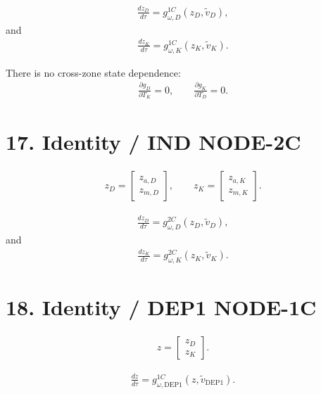 \documentclass[11pt]{article}
\begin{document}
\begin{align}
\boxed{
\frac{dz_D}{d\tau}
=
g_{\omega,D}^{1C}(z_D,\widetilde v_D),
}
\tag{N3.48}
\end{align}
and
\begin{align}
\boxed{
\frac{dz_K}{d\tau}
=
g_{\omega,K}^{1C}(z_K,\widetilde v_K).
}
\tag{N3.49}
\end{align}

There is no cross-zone state dependence:
\begin{align}
\boxed{
\frac{\partial g_D}{\partial T_K}=0,
\qquad
\frac{\partial g_K}{\partial T_D}=0.
}
\tag{N3.50}
\end{align}

\section*{17. Identity / IND NODE-2C}

\begin{align}
\boxed{
z_D=
\begin{bmatrix}
z_{a,D}\\
z_{m,D}
\end{bmatrix},
\qquad
z_K=
\begin{bmatrix}
z_{a,K}\\
z_{m,K}
\end{bmatrix}.
}
\tag{N3.51}
\end{align}

\begin{align}
\boxed{
\frac{dz_D}{d\tau}
=
g_{\omega,D}^{2C}(z_D,\widetilde v_D),
}
\tag{N3.52}
\end{align}
and
\begin{align}
\boxed{
\frac{dz_K}{d\tau}
=
g_{\omega,K}^{2C}(z_K,\widetilde v_K).
}
\tag{N3.53}
\end{align}

\section*{18. Identity / DEP1 NODE-1C}

\begin{align}
\boxed{
z=
\begin{bmatrix}
z_D\\
z_K
\end{bmatrix}.
}
\tag{N3.54}
\end{align}

\begin{align}
\boxed{
\frac{dz}{d\tau}
=
g_{\omega,\mathrm{DEP1}}^{1C}
(z,\widetilde v_{\mathrm{DEP1}}).
}
\tag{N3.55}
\end{align}
\end{document}
